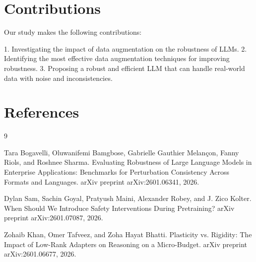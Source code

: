 \documentclass{article}
\begin{document}
\section{Contributions}

Our study makes the following contributions:

1. Investigating the impact of data augmentation on the robustness of LLMs.
2. Identifying the most effective data augmentation techniques for improving robustness.
3. Proposing a robust and efficient LLM that can handle real-world data with noise and inconsistencies.

\section{References}

\begin{thebibliography}{9}

Tara Bogavelli, Oluwanifemi Bamgbose, Gabrielle Gauthier Melançon, Fanny Riols, and Roshnee Sharma. Evaluating Robustness of Large Language Models in Enterprise Applications: Benchmarks for Perturbation Consistency Across Formats and Languages. arXiv preprint arXiv:2601.06341, 2026.

Dylan Sam, Sachin Goyal, Pratyush Maini, Alexander Robey, and J. Zico Kolter. When Should We Introduce Safety Interventions During Pretraining? arXiv preprint arXiv:2601.07087, 2026.

Zohaib Khan, Omer Tafveez, and Zoha Hayat Bhatti. Plasticity vs. Rigidity: The Impact of Low-Rank Adapters on Reasoning on a Micro-Budget. arXiv preprint arXiv:2601.06677, 2026.

\end{thebibliography}
\end{document}
